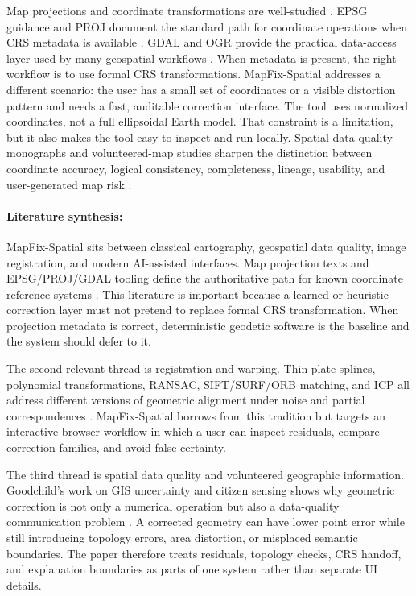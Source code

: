 \documentclass{article}
\begin{document}
Map projections and coordinate transformations are well-studied \citep{snyder1987map}. EPSG guidance and PROJ document the standard path for coordinate operations when CRS metadata is available \citep{epsg72,proj}. GDAL and OGR provide the practical data-access layer used by many geospatial workflows \citep{gdal}. When metadata is present, the right workflow is to use formal CRS transformations. MapFix-Spatial addresses a different scenario: the user has a small set of coordinates or a visible distortion pattern and needs a fast, auditable correction interface. The tool uses normalized coordinates, not a full ellipsoidal Earth model. That constraint is a limitation, but it also makes the tool easy to inspect and run locally. Spatial-data quality monographs and volunteered-map studies sharpen the distinction between coordinate accuracy, logical consistency, completeness, lineage, usability, and user-generated map risk \citep{vanOort2006spatialdataquality,haklay2008osm}.



\paragraph{Literature synthesis:}
MapFix-Spatial sits between classical cartography, geospatial data quality, image registration, and modern AI-assisted interfaces. Map projection texts and EPSG/PROJ/GDAL tooling define the authoritative path for known coordinate reference systems \citep{snyder1987map,epsg72,proj,gdal,ogc2019wkt}. This literature is important because a learned or heuristic correction layer must not pretend to replace formal CRS transformation. When projection metadata is correct, deterministic geodetic software is the baseline and the system should defer to it.

The second relevant thread is registration and warping. Thin-plate splines, polynomial transformations, RANSAC, SIFT/SURF/ORB matching, and ICP all address different versions of geometric alignment under noise and partial correspondences \citep{bookstein1989principal,duchon1977splines,fischler1981ransac,lowe2004sift,bay2006surf,rublee2011orb,besl1992icp,zitova2003image}. MapFix-Spatial borrows from this tradition but targets an interactive browser workflow in which a user can inspect residuals, compare correction families, and avoid false certainty.

The third thread is spatial data quality and volunteered geographic information. Goodchild's work on GIS uncertainty and citizen sensing shows why geometric correction is not only a numerical operation but also a data-quality communication problem \citep{goodchild1992geographical,goodchild2007citizens,haklay2008osm,guptill1995elements,iso19157}. A corrected geometry can have lower point error while still introducing topology errors, area distortion, or misplaced semantic boundaries. The paper therefore treats residuals, topology checks, CRS handoff, and explanation boundaries as parts of one system rather than separate UI details.
\end{document}
